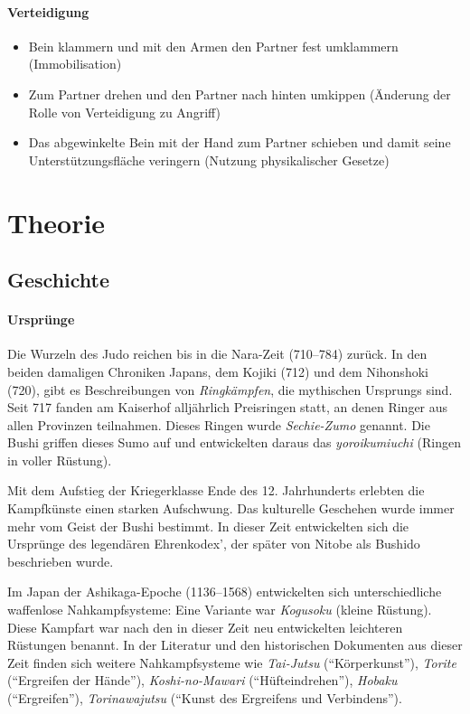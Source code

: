 \documentclass[justified, a4paper, notitlepage, captions=tableheading, nobib]{tufte-handout}
\begin{document}
\paragraph{Verteidigung}
\label{sec:org4cc32d8}
\begin{itemize}
\item Bein klammern und mit den Armen den Partner fest umklammern (Immobilisation)
\item Zum Partner drehen und den Partner nach hinten umkippen (Änderung der Rolle von Verteidigung zu Angriff)
\item Das abgewinkelte Bein mit der Hand zum Partner schieben und damit seine Unterstützungsfläche veringern (Nutzung physikalischer Gesetze)
\end{itemize}

\newpage
\section{Theorie }
\label{sec:org89dc15b}
\subsection{Geschichte}
\label{sec:org7052966}
\paragraph{Ursprünge}
\label{sec:org8098417}
Die Wurzeln des \label{org80c3996}Judo reichen bis in die Nara-Zeit (710–784) zurück. In den beiden damaligen Chroniken Japans, dem Kojiki (712) und dem Nihonshoki (720), gibt es Beschreibungen von \emph{Ringkämpfen}, die mythischen Ursprungs sind. Seit 717 fanden am Kaiserhof alljährlich Preisringen statt, an denen Ringer aus allen Provinzen teilnahmen. Dieses Ringen wurde \emph{Sechie-Zumo} genannt. Die Bushi griffen dieses Sumo auf und entwickelten daraus das \emph{yoroikumiuchi} (Ringen in voller Rüstung).

Mit dem Aufstieg der Kriegerklasse Ende des 12. Jahrhunderts erlebten die Kampfkünste einen starken Aufschwung. Das kulturelle Geschehen wurde immer mehr vom Geist der Bushi bestimmt. In dieser Zeit entwickelten sich die Ursprünge des legendären Ehrenkodex', der später von Nitobe als Bushido beschrieben wurde.

Im Japan der Ashikaga-Epoche (1136–1568) entwickelten sich unterschiedliche waffenlose Nahkampfsysteme: Eine Variante war \emph{Kogusoku} (kleine Rüstung). Diese Kampfart war nach den in dieser Zeit neu entwickelten leichteren Rüstungen benannt. In der Literatur und den historischen Dokumenten aus dieser Zeit finden sich weitere Nahkampfsysteme wie \emph{Tai-Jutsu} ("`Körperkunst"'), \emph{Torite} ("`Ergreifen der Hände"'), \emph{Koshi-no-Mawari} ("`Hüfteindrehen"'), \emph{Hobaku} ("`Ergreifen"'), \emph{Torinawajutsu} ("`Kunst des Ergreifens und Verbindens"').
\end{document}
